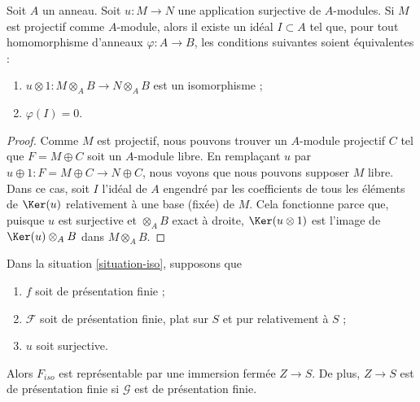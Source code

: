 \begin{lemma}
\label{lemma-flattening-module-map}
Soit $A$ un anneau. Soit $u : M \to N$ une application surjective de $A$-modules.
Si $M$ est projectif comme $A$-module, alors il existe un idéal
$I \subset A$ tel que, pour tout homomorphisme d'anneaux $\varphi : A \to B$,
les conditions suivantes soient équivalentes :
\begin{enumerate}
\item $u \otimes 1 : M \otimes_A B \to N \otimes_A B$ est un
isomorphisme ;
\item $\varphi(I) = 0$.
\end{enumerate}
\end{lemma}

\begin{proof}
Comme $M$ est projectif, nous pouvons trouver un $A$-module projectif $C$
tel que $F = M \oplus C$ soit un $A$-module libre.
En remplaçant $u$ par $u \oplus 1 : F = M \oplus C \to N \oplus C$,
nous voyons que nous pouvons supposer $M$ libre. Dans ce cas, soit $I$
l'idéal de $A$ engendré par les coefficients de tous les éléments de
$\Ker(u)$ relativement à une base (fixée) de $M$.
Cela fonctionne parce que, puisque $u$ est surjective et
$\otimes_A B$ exact à droite, $\Ker(u \otimes 1)$ est
l'image de $\Ker(u) \otimes_A B$ dans $M \otimes_A B$.
\end{proof}

\begin{theorem}
\label{theorem-flattening-map}
Dans la
situation \ref{situation-iso},
supposons que
\begin{enumerate}
\item $f$ soit de présentation finie ;
\item $\mathcal{F}$ soit de présentation finie, plat sur $S$ et
pur relativement à $S$ ;
\item $u$ soit surjective.
\end{enumerate}
Alors $F_{iso}$ est représentable par une immersion fermée $Z \to S$.
De plus, $Z \to S$ est de présentation finie si $\mathcal{G}$ est
de présentation finie.
\end{theorem}

